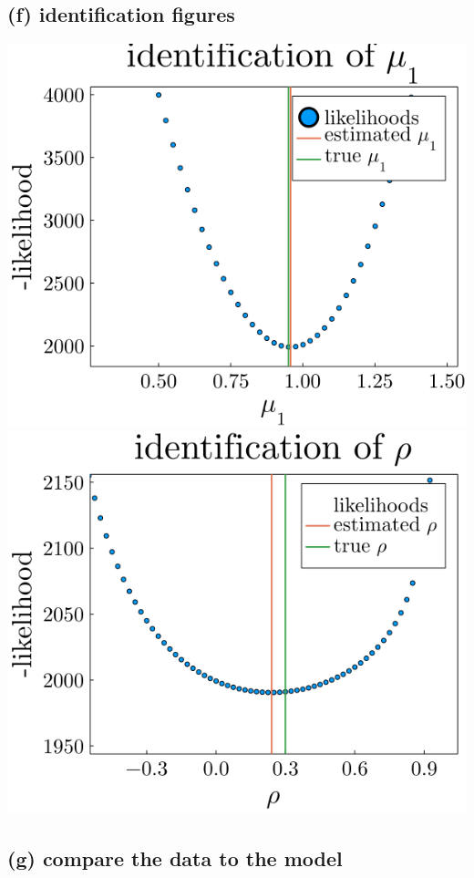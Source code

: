 \documentclass[12pt]{article}
\begin{document}
\subsection*{(f) identification figures}
\begin{center}
\includegraphics[scale = 0.5]{output/mu_id.png}
\\
\includegraphics[scale = 0.5]{output/rho_id.png}
\end{center}

\subsection*{(g) compare the data to the model}

\end{document}
